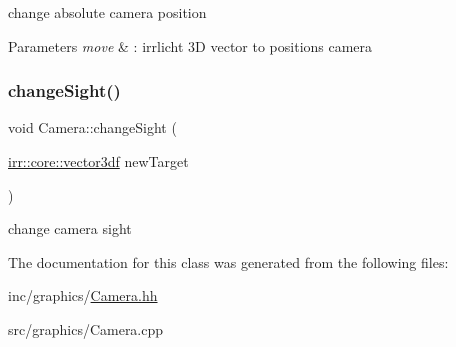 change absolute camera position 


\begin{DoxyParams}{Parameters}
{\em move} & \+: irrlicht 3D vector to positions camera \\
\hline
\end{DoxyParams}
\mbox{\label{classCamera_a8c11f289be05671191a4f91288155685}} 
\subsubsection{\texorpdfstring{change\+Sight()}{changeSight()}}
{\footnotesize\ttfamily void Camera\+::change\+Sight (\begin{DoxyParamCaption}\item[{\hyperlink{namespaceirr_1_1core_a06f169d08b5c429f5575acb7edbad811}{irr\+::core\+::vector3df}}]{new\+Target }\end{DoxyParamCaption})}



change camera sight 



The documentation for this class was generated from the following files\+:\begin{DoxyCompactItemize}
\item 
inc/graphics/\hyperlink{Camera_8hh}{Camera.\+hh}\item 
src/graphics/Camera.\+cpp\end{DoxyCompactItemize}
